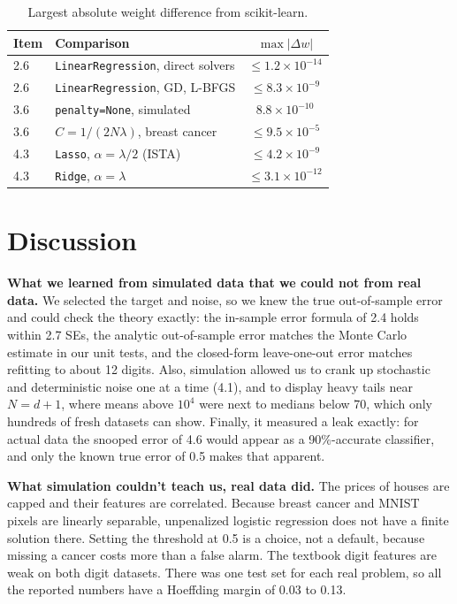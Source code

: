 \documentclass[conference]{IEEEtran}
\begin{document}
\begin{table}[!t]
\caption{Largest absolute weight difference from scikit-learn.}
\label{tab:lib}
\centering\footnotesize
\begin{tabular}{llc}
\toprule
Item & Comparison & $\max|\Delta w|$\\
\midrule
2.6 & \texttt{LinearRegression}, direct solvers & $\le1.2\times10^{-14}$\\
2.6 & \texttt{LinearRegression}, GD, L-BFGS & $\le8.3\times10^{-9}$\\
3.6 & \texttt{penalty=None}, simulated & $8.8\times10^{-10}$\\
3.6 & $C=1/(2N\lambda)$, breast cancer & $\le9.5\times10^{-5}$\\
4.3 & \texttt{Lasso}, $\alpha=\lambda/2$ (ISTA) & $\le4.2\times10^{-9}$\\
4.3 & \texttt{Ridge}, $\alpha=\lambda$ & $\le3.1\times10^{-12}$\\
\bottomrule
\end{tabular}
\end{table}

\section{Discussion}\label{sec:disc}
\textbf{What we learned from simulated data that we could not from real data.} We selected the target and noise, so we knew the true out-of-sample error and could check the theory exactly: the in-sample error formula of 2.4 holds within 2.7 SEs, the analytic out-of-sample error matches the Monte Carlo estimate in our unit tests, and the closed-form leave-one-out error matches refitting to about 12 digits. Also, simulation allowed us to crank up stochastic and deterministic noise one at a time (4.1), and to display heavy tails near $N=d+1$, where means above $10^4$ were next to medians below 70, which only hundreds of fresh datasets can show. Finally, it measured a leak exactly: for actual data the snooped error of 4.6 would appear as a 90\%-accurate classifier, and only the known true error of 0.5 makes that apparent.

\textbf{What simulation couldn't teach us, real data did.} The prices of houses are capped and their features are correlated. Because breast cancer and MNIST pixels are linearly separable, unpenalized logistic regression does not have a finite solution there. Setting the threshold at 0.5 is a choice, not a default, because missing a cancer costs more than a false alarm. The textbook digit features are weak on both digit datasets. There was one test set for each real problem, so all the reported numbers have a Hoeffding margin of 0.03 to 0.13.
\end{document}
